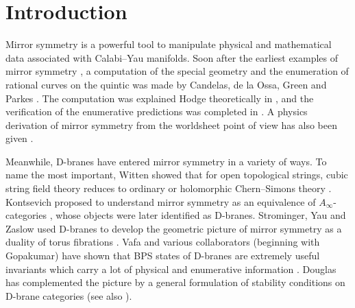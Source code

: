 
\makepapertitle

\body

\version\versionno


\tableofcontents

\section{Introduction}

Mirror symmetry is a powerful tool to manipulate physical and 
mathematical data associated with Calabi--Yau manifolds. Soon after the
earliest examples of mirror symmetry \cite{CLS,GP,Aspinwall:1990xe},
a computation of the special geometry and the enumeration of rational 
curves on the quintic was made by Candelas, de la Ossa, Green and Parkes 
\cite{cdgp}. The computation was explained Hodge theoretically in 
\cite{guide}, and the verification of the enumerative predictions 
was completed in \cite{complete1,complete2}. A physics derivation 
of mirror symmetry from the worldsheet point of view has also been 
given \cite{Morrison:1995yh, hova}.

Meanwhile, D-branes have entered mirror symmetry in a variety of ways.
To name the most important, Witten showed that for open topological 
strings, cubic string field theory reduces to ordinary or holomorphic 
Chern--Simons theory \cite{wcs}. Kontsevich proposed to understand mirror 
symmetry as an equivalence of $A_\infty$-categories \cite{hms}, whose objects 
were later identified as D-branes. Strominger, Yau and 
Zaslow used D-branes to develop the geometric picture of mirror 
symmetry as a duality of torus fibrations \cite{syz}. 
Vafa and various collaborators (beginning with Gopakumar)
have shown that BPS states of 
D-branes are extremely useful invariants which carry a lot of physical 
and enumerative information \cite{gova}. Douglas has complemented the 
picture by a general formulation of stability conditions on D-brane 
categories \cite{douglas} (see also \cite{Aspinwall:2001pu}).

